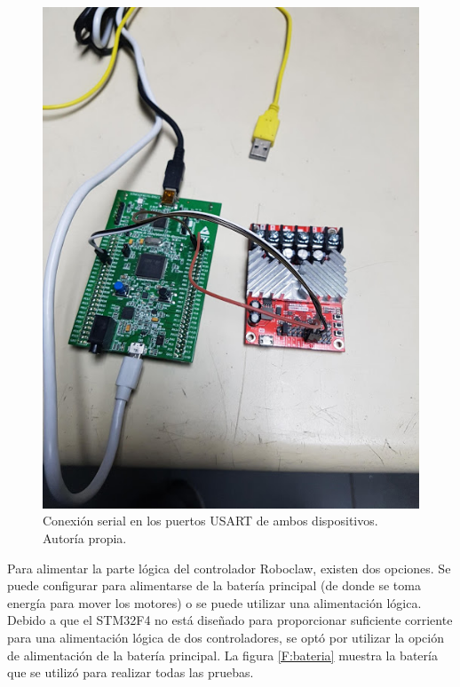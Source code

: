\begin{figure}[h!]
\centering
\includegraphics[scale=0.5]{imagenes/roboclaw-stm.jpg}
\caption{Conexión serial en los puertos USART de ambos dispositivos. Autoría propia.}
\label{F:roboclaw-stm}
\end{figure}

Para alimentar la parte lógica del controlador Roboclaw, existen dos opciones. Se puede configurar para alimentarse de la batería principal (de donde se toma energía para mover los motores) o se puede utilizar una alimentación lógica. Debido a que el STM32F4 no está diseñado para proporcionar suficiente corriente para una alimentación lógica de dos controladores, se optó por utilizar la opción de alimentación de la batería principal. La figura \ref{F:bateria} muestra la batería que se utilizó para realizar todas las pruebas.

